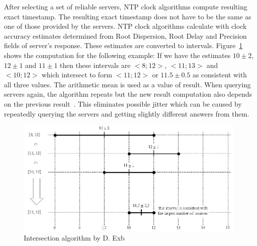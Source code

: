 After selecting a set of reliable servers, NTP clock algorithms compute resulting exact timestamp.
The resulting exact timestamp does not have to be the same
as one of those provided by the servers.
NTP clock algorithms calculate with clock accuracy estimates
determined from Root Dispersion, Root Delay and Precision fields of server's response.
These estimates are converted to intervals.
Figure~\ref{fig:ntp-intersection} shows the computation for the following example:
If we have the estimates $10 \pm 2$, $12 \pm 1$ and $11 \pm 1$
then these intervals are $<8; 12>$, $<11; 13>$ and $<10; 12>$ which
intersect to form $<11; 12>$ or $11.5 \pm 0.5$ as consistent with all three values.
The arithmetic mean is used as a value of result.
When querying servers again, the algorithm repeats but the new result computation
also depends on the previous result~\cite{rfc5905,ntp-history}.
This eliminates possible jitter which can be caused by repeatedly querying the servers
and getting slightly different answers from them.

\begin{figure}
	\centering
	\includegraphics[width=13cm,keepaspectratio]{fig/Marzullo_example-1.jpg}
	\caption{Intersection algorithm by D. Exb}
	\label{fig:ntp-intersection}
	\bigskip
\end{figure}

